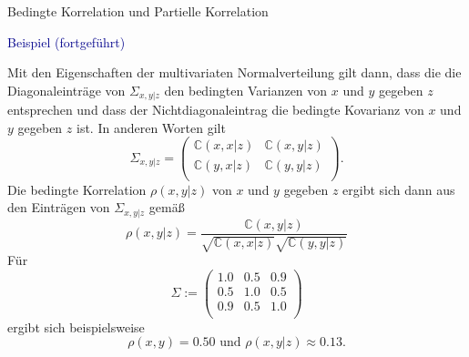 \documentclass[
  8pt,
  ignorenonframetext,
]{beamer}
\begin{document}
\begin{frame}{Bedingte Korrelation und Partielle Korrelation}
\protect\hypertarget{bedingte-korrelation-und-partielle-korrelation-4}{}
\small
\vspace{1mm}

\textcolor{darkblue}{Beispiel (fortgeführt)} \footnotesize

Mit den Eigenschaften der multivariaten Normalverteilung gilt dann, dass
die die Diagonaleinträge von \(\Sigma_{x,y|z}\) den bedingten Varianzen
von \(x\) und \(y\) gegeben \(z\) entsprechen und dass der
Nichtdiagonaleintrag die bedingte Kovarianz von \(x\) und \(y\) gegeben
\(z\) ist. In anderen Worten gilt \begin{equation}
\Sigma_{x,y|z} =
\begin{pmatrix}
\mathbb{C}(x,x|z) & \mathbb{C}(x,y|z)   \\
\mathbb{C}(y,x|z) & \mathbb{C}(y,y|z)   \\
\end{pmatrix}.
\end{equation} Die bedingte Korrelation \(\rho(x,y|z)\) von \(x\) und
\(y\) gegeben \(z\) ergibt sich dann aus den Einträgen von
\(\Sigma_{x,y|z}\) gemäß \begin{equation}
\rho(x,y|z) = \frac{\mathbb{C}(x,y|z)}{\sqrt{\mathbb{C}(x,x|z)}\sqrt{\mathbb{C}(y,y|z)}}
\end{equation} Für \begin{equation}
\Sigma :=
\begin{pmatrix}
1.0 & 0.5 & 0.9 \\
0.5 & 1.0 & 0.5 \\
0.9 & 0.5 & 1.0 \\
\end{pmatrix}
\end{equation} ergibt sich beispielsweise \begin{equation}
\rho(x,y) = 0.50 \mbox{ und } \rho(x,y|z) \approx 0.13.
\end{equation}
\end{frame}
\end{document}
